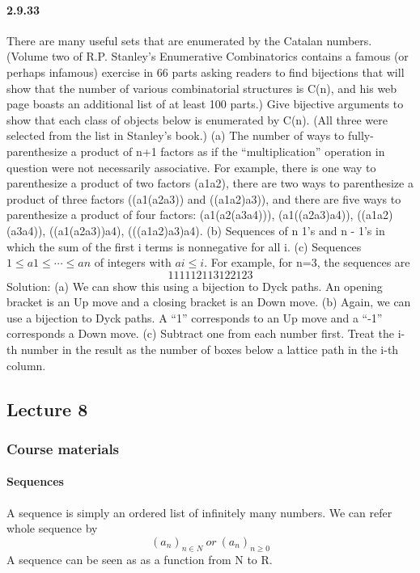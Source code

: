 \documentclass{article}
\begin{document}
\paragraph{2.9.33}
There are many useful sets that are enumerated by the Catalan numbers. (Volume two of R.P. Stanley’s Enumerative Combinatorics contains a famous (or perhaps infamous) exercise in 66 parts asking readers to find bĳections that will show that the
number of various combinatorial structures is C(n), and his web page boasts an additional list of at least 100 parts.) Give bĳective arguments to show that each class of
objects below is enumerated by C(n). (All three were selected from the list in Stanley’s
book.) \newline
(a) The number of ways to fully-parenthesize a product of n+1 factors as if the “multiplication” operation in question were not necessarily associative. For example,
there is one way to parenthesize a product of two factors (a1a2), there are two ways
to parenthesize a product of three factors ((a1(a2a3)) and ((a1a2)a3)), and there are
five ways to parenthesize a product of four factors:\newline
(a1(a2(a3a4))), (a1((a2a3)a4)), ((a1a2)(a3a4)), ((a1(a2a3))a4), (((a1a2)a3)a4).\newline
(b) Sequences of n 1’s and n - 1’s in which the sum of the first i terms is nonnegative
for all i.\newline
(c) Sequences $1 \leq a1 \leq \cdots \leq an$ of integers with $ai \leq i$. For example, for n=3, the
sequences are
$$111 112 113 122 123 $$
Solution:\newline
(a) We can show this using a bijection to Dyck paths. An opening bracket is an Up move and a closing
bracket is an Down move.\newline
(b) Again, we can use a bijection to Dyck paths. A “1” corresponds to an Up move and a “-1” corresponds a
Down move.\newline
(c) Subtract one from each number first. Treat the i-th number in the result as the number of boxes below
a lattice path in the i-th column.
\subsection{Lecture 8}
\subsubsection{Course materials}
\paragraph{Sequences}
A sequence is simply an ordered list of infinitely many
numbers. \newline
We can refer whole sequence by
$$(a_n)_{n\in N} \ or \ (a_n)_{n\ge 0}$$
A sequence can be seen as as a function from N to R.
\end{document}
